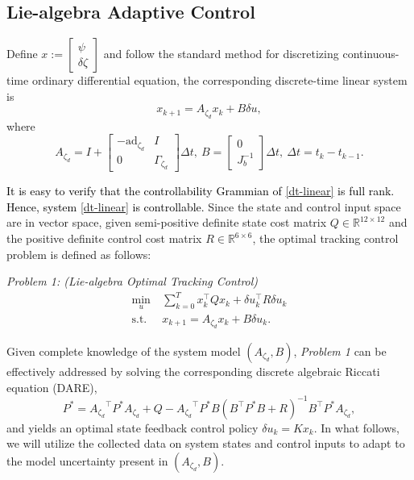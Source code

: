 \documentclass[lettersize,journal]{IEEEtran}
\newcommand{\ad}{\text{ad}}
\begin{document}
\subsection{Lie-algebra Adaptive Control}
Define $x := \begin{bmatrix}
    \psi \\ \delta \zeta
\end{bmatrix}$ and follow the standard method for discretizing continuous-time ordinary differential equation\cite{lewis2012optimal}, the corresponding discrete-time linear system is %
\begin{equation}\label{dt-linear}
        x_{k+1} =A_{\zeta_d}x_k + B\delta u, 
\end{equation}
where 
\begin{equation*}
    A_{\zeta_d} = I +  \begin{bmatrix}
        -\ad_{\zeta_d} & I \\ 0 & \Gamma_{\zeta_d}
    \end{bmatrix}\Delta t,~ B = \begin{bmatrix}
    0 \\ J_b^{-1}
\end{bmatrix}\Delta t, ~ \Delta t = t_k - t_{k-1}.
\end{equation*}

\textcolor{black}{It is easy to verify that the controllability Grammian of \eqref{dt-linear} is full rank. Hence, system \eqref{dt-linear} is controllable.} Since the state and control input space are in vector space, given semi-positive definite state cost matrix $Q \in \mathbb{R}^{12 \times 12}$ and the positive definite control cost matrix $R \in \mathbb{R}^{6 \times 6}$, the optimal tracking control problem is defined as follows:

\noindent\textit{{Problem 1}: (Lie-algebra Optimal Tracking Control)}
\begin{subequations}
\begin{align}
    \min_{u} &~\sum_{k=0}^{T}x_k^{\top}Q x_k+ \delta{u}_k^{\top}R\delta{u}_k\\
    \text{s.t.} &~x_{k+1} =A_{\zeta_d}x_k + B\delta{u}_k.\label{p1-constraint}
\end{align}
\end{subequations}

Given complete knowledge of the system model $(A_{\zeta_d}, B)$, \textit{Problem 1} can be effectively addressed by solving the corresponding discrete algebraic Riccati equation (DARE), 
\begin{equation*}
P^{*}={A_{\zeta_d}}^{\top} P^{*} {A_{\zeta_d}}+Q-{A_{\zeta_d}}^{\top} P^{*} {{B}}\left({{B}}^{\top} P^{*} {{B}}+R\right)^{-1} {{B}}^{\top} P^{*} {A_{\zeta_d}},
\end{equation*}
and yields an optimal state feedback control policy $\delta u_k = K x_k$. In what follows, we will utilize the collected data on system states and control inputs to adapt to the model uncertainty present in $(A_{\zeta_d}, B)$. 
\end{document}
